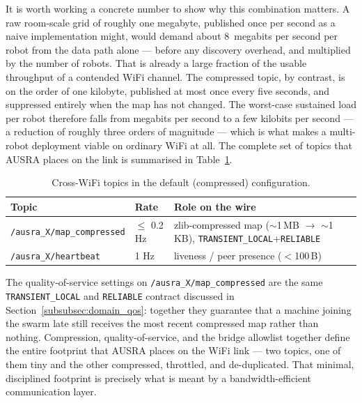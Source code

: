 It is worth working a concrete number to show why this combination matters. A raw room-scale grid of roughly one megabyte, published once per second as a naive implementation might, would demand about 8~megabits per second per robot from the data path alone --- before any discovery overhead, and multiplied by the number of robots. That is already a large fraction of the usable throughput of a contended WiFi channel. The compressed topic, by contrast, is on the order of one kilobyte, published at most once every five seconds, and suppressed entirely when the map has not changed. The worst-case sustained load per robot therefore falls from megabits per second to a few kilobits per second --- a reduction of roughly three orders of magnitude --- which is what makes a multi-robot deployment viable on ordinary WiFi at all. The complete set of topics that AUSRA places on the link is summarised in Table~\ref{tab:cross_wifi_topics}.

\begin{table}[H]
    \centering
    \caption{Cross-WiFi topics in the default (compressed) configuration.}
    \label{tab:cross_wifi_topics}
    \begin{tabularx}{\textwidth}{@{}l l X@{}}
        \toprule
        \textbf{Topic} & \textbf{Rate} & \textbf{Role on the wire} \\
        \midrule
        \texttt{/ausra\_X/map\_compressed} & $\leq$ 0.2 Hz & zlib-compressed map ($\sim$1\,MB $\rightarrow$ $\sim$1\,KB), \texttt{TRANSIENT\_LOCAL}+\texttt{RELIABLE} \\
        \texttt{/ausra\_X/heartbeat} & 1 Hz & liveness / peer presence ($<$100\,B) \\
        \bottomrule
    \end{tabularx}
\end{table}

The quality-of-service settings on \texttt{/ausra\_X/map\_compressed} are the same \texttt{TRANSIENT\_LOCAL} and \texttt{RELIABLE} contract discussed in Section~\ref{subsubsec:domain_qos}: together they guarantee that a machine joining the swarm late still receives the most recent compressed map rather than nothing. Compression, quality-of-service, and the bridge allowlist together define the entire footprint that AUSRA places on the WiFi link --- two topics, one of them tiny and the other compressed, throttled, and de-duplicated. That minimal, disciplined footprint is precisely what is meant by a bandwidth-efficient communication layer.


